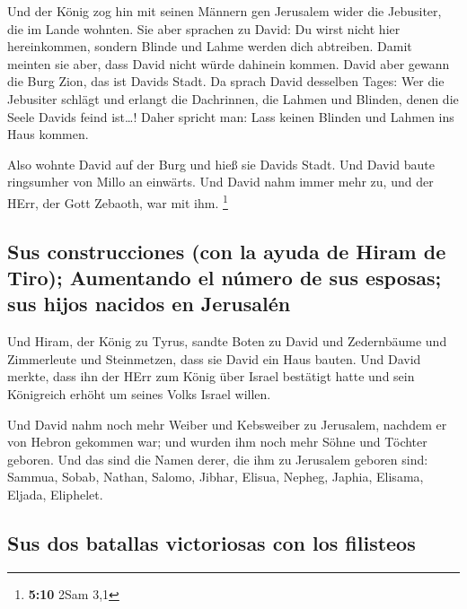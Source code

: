  Und der König zog hin mit seinen Männern gen Jerusalem
wider die Jebusiter, die im Lande wohnten. Sie aber sprachen zu David:
Du wirst nicht hier hereinkommen, sondern Blinde und Lahme werden dich
abtreiben. Damit meinten sie aber, dass David nicht würde dahinein
kommen.  David aber gewann die Burg Zion, das ist Davids
Stadt.  Da sprach David desselben Tages: Wer die Jebusiter
schlägt und erlangt die Dachrinnen, die Lahmen und Blinden, denen die
Seele Davids feind ist\ldots! Daher spricht man: Lass keinen Blinden und
Lahmen ins Haus kommen.

 Also wohnte David auf der Burg und hieß sie Davids Stadt.
Und David baute ringsumher von Millo an einwärts.  Und
David nahm immer mehr zu, und der HErr, der Gott Zebaoth, war mit ihm.
\footnote{\textbf{5:10} 2Sam 3,1}

\hypertarget{sus-construcciones-con-la-ayuda-de-hiram-de-tiro-aumentando-el-nuxfamero-de-sus-esposas-sus-hijos-nacidos-en-jerusaluxe9n}{%
\subsection{Sus construcciones (con la ayuda de Hiram de Tiro);
Aumentando el número de sus esposas; sus hijos nacidos en
Jerusalén}\label{sus-construcciones-con-la-ayuda-de-hiram-de-tiro-aumentando-el-nuxfamero-de-sus-esposas-sus-hijos-nacidos-en-jerusaluxe9n}}

 Und Hiram, der König zu Tyrus, sandte Boten zu David und
Zedernbäume und Zimmerleute und Steinmetzen, dass sie David ein Haus
bauten.  Und David merkte, dass ihn der HErr zum König
über Israel bestätigt hatte und sein Königreich erhöht um seines Volks
Israel willen.

 Und David nahm noch mehr Weiber und Kebsweiber zu
Jerusalem, nachdem er von Hebron gekommen war; und wurden ihm noch mehr
Söhne und Töchter geboren.  Und das sind die Namen derer,
die ihm zu Jerusalem geboren sind: Sammua, Sobab, Nathan, Salomo,
 Jibhar, Elisua, Nepheg, Japhia,  Elisama,
Eljada, Eliphelet.

\hypertarget{sus-dos-batallas-victoriosas-con-los-filisteos}{%
\subsection{Sus dos batallas victoriosas con los
filisteos}\label{sus-dos-batallas-victoriosas-con-los-filisteos}}

